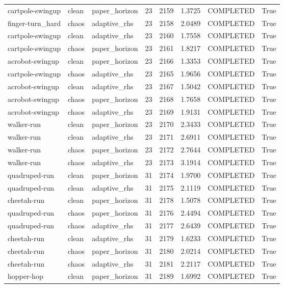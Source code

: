 \begin{tabular}{llllllll}
cartpole-swingup & clean & paper\_horizon & 23 & 2159 & 1.3725 & COMPLETED & True \\
finger-turn\_hard & chaos & adaptive\_rhs & 23 & 2158 & 2.0489 & COMPLETED & True \\
cartpole-swingup & clean & adaptive\_rhs & 23 & 2160 & 1.7558 & COMPLETED & True \\
cartpole-swingup & chaos & paper\_horizon & 23 & 2161 & 1.8217 & COMPLETED & True \\
acrobot-swingup & clean & paper\_horizon & 23 & 2166 & 1.3353 & COMPLETED & True \\
cartpole-swingup & chaos & adaptive\_rhs & 23 & 2165 & 1.9656 & COMPLETED & True \\
acrobot-swingup & clean & adaptive\_rhs & 23 & 2167 & 1.5042 & COMPLETED & True \\
acrobot-swingup & chaos & paper\_horizon & 23 & 2168 & 1.7658 & COMPLETED & True \\
acrobot-swingup & chaos & adaptive\_rhs & 23 & 2169 & 1.9131 & COMPLETED & True \\
walker-run & clean & paper\_horizon & 23 & 2170 & 2.3433 & COMPLETED & True \\
walker-run & clean & adaptive\_rhs & 23 & 2171 & 2.6911 & COMPLETED & True \\
walker-run & chaos & paper\_horizon & 23 & 2172 & 2.7644 & COMPLETED & True \\
walker-run & chaos & adaptive\_rhs & 23 & 2173 & 3.1914 & COMPLETED & True \\
quadruped-run & clean & paper\_horizon & 31 & 2174 & 1.9700 & COMPLETED & True \\
quadruped-run & clean & adaptive\_rhs & 31 & 2175 & 2.1119 & COMPLETED & True \\
cheetah-run & clean & paper\_horizon & 31 & 2178 & 1.5078 & COMPLETED & True \\
quadruped-run & chaos & paper\_horizon & 31 & 2176 & 2.4494 & COMPLETED & True \\
quadruped-run & chaos & adaptive\_rhs & 31 & 2177 & 2.6439 & COMPLETED & True \\
cheetah-run & clean & adaptive\_rhs & 31 & 2179 & 1.6233 & COMPLETED & True \\
cheetah-run & chaos & paper\_horizon & 31 & 2180 & 2.0214 & COMPLETED & True \\
cheetah-run & chaos & adaptive\_rhs & 31 & 2181 & 2.2117 & COMPLETED & True \\
hopper-hop & clean & paper\_horizon & 31 & 2189 & 1.6992 & COMPLETED & True \\

\end{tabular}
